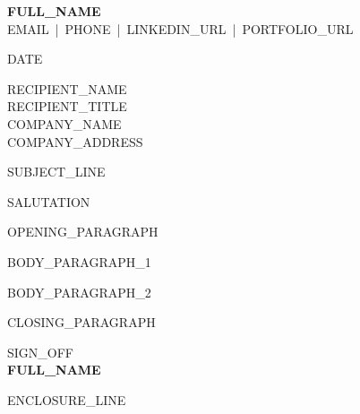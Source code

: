 \documentclass[a4paper,11pt]{article}
\begin{document}
\begin{flushright}
  \textbf{{{FULL_NAME}}}\\
  {{EMAIL}} \,|\, {{PHONE}} \,|\, {{LINKEDIN_URL}} \,|\, {{PORTFOLIO_URL}}
\end{flushright}
\vspace{1em}

{{DATE}}

\vspace{1em}
{{RECIPIENT_NAME}}\\
{{RECIPIENT_TITLE}}\\
{{COMPANY_NAME}}\\
{{COMPANY_ADDRESS}}

\vspace{1.5em}
{{SUBJECT_LINE}}

\vspace{1em}
{{SALUTATION}}

{{OPENING_PARAGRAPH}}

{{BODY_PARAGRAPH_1}}

{{BODY_PARAGRAPH_2}}

{{CLOSING_PARAGRAPH}}

\vspace{2em}
{{SIGN_OFF}}\\[2.5em]
\textbf{{{FULL_NAME}}}

\vspace{2em}
{{ENCLOSURE_LINE}}
\end{document}
